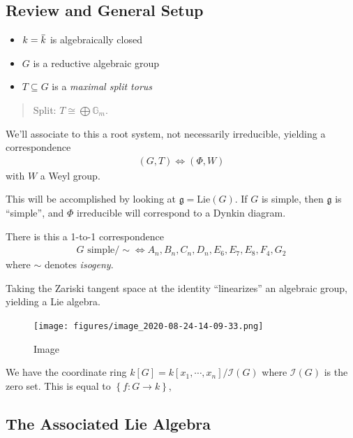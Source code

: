 \hypertarget{review-and-general-setup}{%
\subsection{Review and General Setup}\label{review-and-general-setup}}

\begin{itemize}
\tightlist
\item
  \(k = \mkern 1.5mu\overline{\mkern-1.5muk\mkern-1.5mu}\mkern 1.5mu\)
  is algebraically closed
\item
  \(G\) is a reductive algebraic group
\item
  \(T\subseteq G\) is a \emph{maximal split torus}
\end{itemize}

\begin{quote}
Split: \(T\cong \bigoplus {\mathbb{G}}_m\).
\end{quote}

We'll associate to this a root system, not necessarily irreducible,
yielding a correspondence
\begin{align*}  
(G, T) \iff (\Phi, W)
\end{align*}
with \(W\) a Weyl group.

This will be accomplished by looking at
\({\mathfrak{g}}= \mathrm{Lie}(G)\). If \(G\) is simple, then
\({\mathfrak{g}}\) is ``simple'', and \(\Phi\) irreducible will
correspond to a Dynkin diagram.

There is this a 1-to-1 correspondence
\begin{align*}  
G \text{ simple}/\sim \iff A_n, B_n, C_n, D_n, E_6, E_7, E_8, F_4, G_2
\end{align*}
where \(\sim\) denotes \emph{isogeny}.

Taking the Zariski tangent space at the identity ``linearizes'' an
algebraic group, yielding a Lie algebra.

\begin{figure}
\centering
\texttt{[image: figures/image\_2020-08-24-14-09-33.png]}
\caption{Image}
\end{figure}

We have the coordinate ring
\(k[G] = k[x_1, \cdots, x_n] / \mathcal{I}(G)\) where \(\mathcal{I}(G)\)
is the zero set. This is equal to \(\left\{{f:G\to k}\right\}\),

\hypertarget{the-associated-lie-algebra}{%
\subsection{The Associated Lie
Algebra}\label{the-associated-lie-algebra}}

